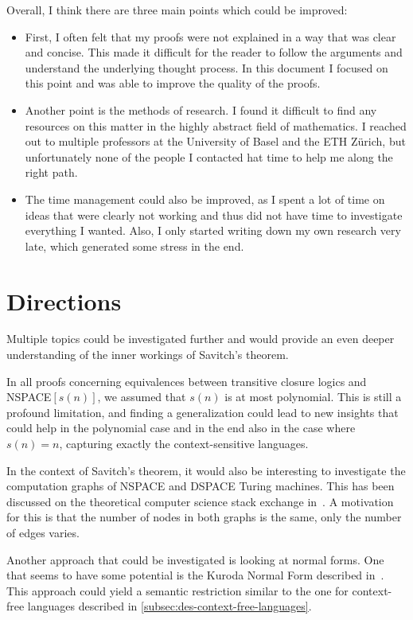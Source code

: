 Overall, I think there are three main points which could be improved:
\begin{itemize}
    \setlength\itemsep{0.15em}
    \item First, I often felt that my proofs were not explained in a way that was clear and concise.
    This made it difficult for the reader to follow the arguments and understand the underlying thought process.
    In this document I focused on this point and was able to improve the quality of the proofs.
    \item Another point is the methods of research.
    I found it difficult to find any resources on this matter in the highly abstract field of mathematics.
    I reached out to multiple professors at the University of Basel and the ETH Zürich, but unfortunately none of the people I contacted hat time to help me along the right path.
    \item The time management could also be improved, as I spent a lot of time on ideas that were clearly not working and thus did not have time to investigate everything I wanted.
    Also, I only started writing down my own research very late, which generated some stress in the end.
\end{itemize}

\section{Directions}\label{sec:directions}
Multiple topics could be investigated further and would provide an even deeper understanding of the inner workings of Savitch's theorem.

In all proofs concerning equivalences between transitive closure logics and NSPACE$[s(n)]$, we assumed that $s(n)$ is at most polynomial.
This is still a profound limitation, and finding a generalization could lead to new insights that could help in the polynomial case and in the end also in the case where $s(n) = n$, capturing exactly the context-sensitive languages.

In the context of Savitch's theorem, it would also be interesting to investigate the computation graphs of NSPACE and DSPACE Turing machines.
This has been discussed on the theoretical computer science stack exchange in~\cite{Barak2010}.
A motivation for this is that the number of nodes in both graphs is the same, only the number of edges varies.

Another approach that could be investigated is looking at normal forms.
One that seems to have some potential is the Kuroda Normal Form described in~\cite{Kuroda1964}.
This approach could yield a semantic restriction similar to the one for context-free languages described in \cref{subsec:des-context-free-languages}.

